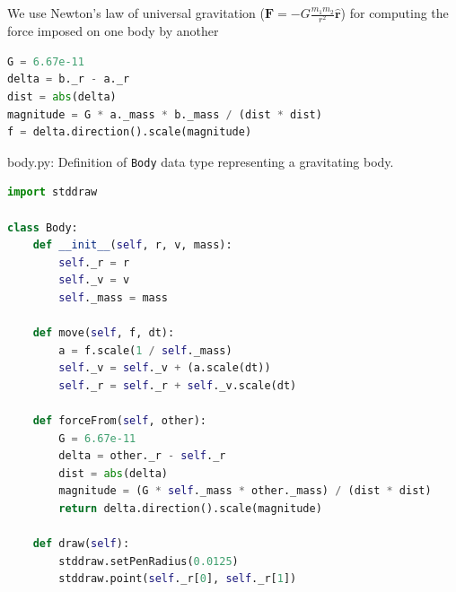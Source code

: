 \documentclass[8pt,a4paper,compress]{beamer}
\begin{document}
\begin{frame}[fragile]
\pause

We use Newton's law of universal gravitation ($\mathbf{F}=-G\frac{m_1m_2}{r^2}\hat{\mathbf{r}}$) for computing the force imposed on one body by another

\begin{lstlisting}[language=Python]
G = 6.67e-11
delta = b._r - a._r
dist = abs(delta)
magnitude = G * a._mass * b._mass / (dist * dist)
f = delta.direction().scale(magnitude)
\end{lstlisting}

\begin{center}
\end{center}
\end{frame}

\begin{frame}[fragile]
\pause

\begin{framed}
\tiny body.py: Definition of \lstinline{Body} data type representing a gravitating body.
\end{framed}

\begin{lstlisting}[language=Python]
import stddraw

class Body:
    def __init__(self, r, v, mass):
        self._r = r
        self._v = v
        self._mass = mass

    def move(self, f, dt):
        a = f.scale(1 / self._mass)
        self._v = self._v + (a.scale(dt))
        self._r = self._r + self._v.scale(dt)

    def forceFrom(self, other):
        G = 6.67e-11
        delta = other._r - self._r
        dist = abs(delta)
        magnitude = (G * self._mass * other._mass) / (dist * dist)
        return delta.direction().scale(magnitude)

    def draw(self):
        stddraw.setPenRadius(0.0125)
        stddraw.point(self._r[0], self._r[1])
\end{lstlisting}
\end{frame}
\end{document}
